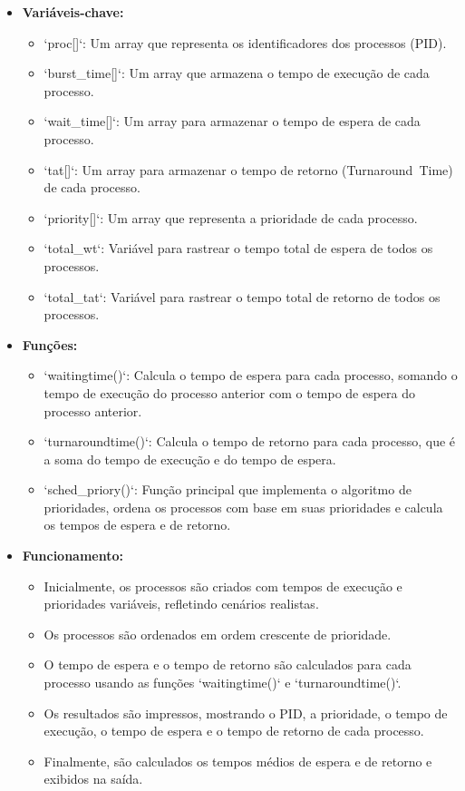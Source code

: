 \documentclass[
	12pt,				%
	openright,			%
	oneside,			%
	a4paper,			%
	chapter=TITLE,		%
	english,			%
	french,				%
	spanish,			%
	brazil				%
	]{abntex2}
\theoremstyle{definition}
\begin{document}
\begin{itemize}
    \item \textbf{Variáveis-chave:}
      \begin{itemize}
        \item `proc[]`: Um array que representa os identificadores dos processos (PID).
        \item `burst\_time[]`: Um array que armazena o tempo de execução de cada processo.
        \item `wait\_time[]`: Um array para armazenar o tempo de espera de cada processo.
        \item `tat[]`: Um array para armazenar o tempo de retorno (Turnaround\ Time) de cada processo.
        \item `priority[]`: Um array que representa a prioridade de cada processo.
        \item `total\_wt`: Variável para rastrear o tempo total de espera de todos os processos.
        \item `total\_tat`: Variável para rastrear o tempo total de retorno de todos os processos.
      \end{itemize}
  
    \item \textbf{Funções:}
      \begin{itemize}
        \item `waitingtime()`: Calcula o tempo de espera para cada processo, somando o tempo de execução do processo anterior com o tempo de espera do processo anterior.
        \item `turnaroundtime()`: Calcula o tempo de retorno para cada processo, que é a soma do tempo de execução e do tempo de espera.
        \item `sched\_priory()`: Função principal que implementa o algoritmo de prioridades, ordena os processos com base em suas prioridades e calcula os tempos de espera e de retorno.
      \end{itemize}
  
    \item \textbf{Funcionamento:}
      \begin{itemize}
        \item Inicialmente, os processos são criados com tempos de execução e prioridades variáveis, refletindo cenários realistas.
        \item Os processos são ordenados em ordem crescente de prioridade.
        \item O tempo de espera e o tempo de retorno são calculados para cada processo usando as funções `waitingtime()` e `turnaroundtime()`.
        \item Os resultados são impressos, mostrando o PID, a prioridade, o tempo de execução, o tempo de espera e o tempo de retorno de cada processo.
        \item Finalmente, são calculados os tempos médios de espera e de retorno e exibidos na saída.
      \end{itemize}
  \end{itemize}
\end{document}
